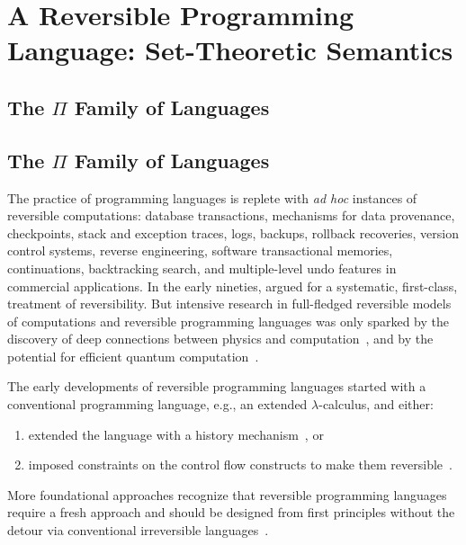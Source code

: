 \section{A Reversible Programming Language: Set-Theoretic Semantics}
\label{sec:reversibleone}
\label{sec:reversibletwo}
\label{langeqeq}
\label{sec:informal}

\subsection{The $\Pi$ Family of Languages}


\subsection{The $\Pi$ Family of Languages}


The practice of programming languages is replete with \emph{ad hoc} instances of reversible computations: database
transactions, mechanisms for data provenance, checkpoints, stack and exception traces, logs, backups, rollback
recoveries, version control systems, reverse engineering, software transactional memories, continuations, backtracking
search, and multiple-level undo features in commercial applications. In the early nineties,
\citet{Baker:1992:LLL,Baker:1992:NFT} argued for a systematic, first-class, treatment of reversibility. But intensive
research in full-fledged reversible models of computations and reversible programming languages was only sparked by the
discovery of deep connections between physics and
computation~\cite{Landauer:1961,PhysRevA.32.3266,Toffoli:1980,bennett1985fundamental,Frank:1999:REC:930275, Hey:1999:FCE:304763,fredkin1982conservative}, and by the
potential for efficient quantum computation~\cite{springerlink:10.1007/BF02650179}.

The early developments of reversible programming languages started
with a conventional programming language, e.g., an extended
$\lambda$-calculus, and either:
\begin{enumerate}
  \item extended the language with a history
        mechanism~\cite{vanTonder:2004,Kluge:1999:SEMCD,lorenz,danos2004reversible}, or
  \item imposed constraints on the control flow constructs to make them
        reversible~\cite{Yokoyama:2007:RPL:1244381.1244404}.
\end{enumerate}
More foundational approaches recognize that reversible programming languages require a fresh approach and should be
designed from first principles without the detour via conventional irreversible
languages~\cite{Yokoyama:2008:PRP,Mu:2004:ILRC,abramsky2005structural,DiPierro:2006:RCL:1166042.1166047,
  rc2011,James:2012:IE:2103656.2103667,Carette2016}.

